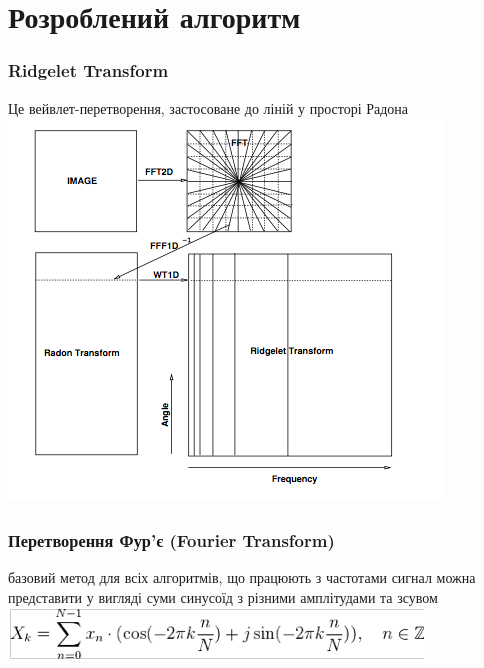 \documentclass[12pt]{beamer}
\begin{document}
\section{Розроблений алгоритм}
\begin{frame}\frametitle{Ridgelet Transform }
	Це вейвлет-перетворення, застосоване до ліній у просторі Радона
	\includegraphics[scale=0.35]{images/ridgelet}	 
\end{frame}
\begin{frame}\frametitle{Перетворення Фур'є (Fourier Transform)  }
	базовий метод для всіх алгоритмів, що працюють з частотами \linebreak \linebreak  
	сигнал можна представити у вигляді суми синусоїд з різними амплітудами та зсувом
	\includegraphics[scale=0.5]{images/fourier_1d} 
\end{frame}
\end{document}
